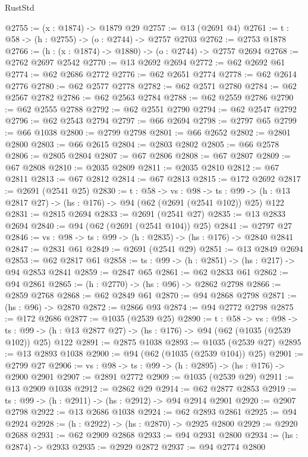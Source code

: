 \begin{lexlean}{RustStd}
\begin{coremodule}
@2755 := (x : @1874) -> @1879 @29
@2757 := @13 (@2691 @4)
@2761 := {t : @58} -> (h : @2755) -> (o : @2744) -> @2757 @2703
@2762 := @2753 @1878
@2766 := (h : (x : @1874) -> @1880) -> (o : @2744) -> @2757 @2694
@2768 := @2762 @2697 @2542
@2770 := @13 @2692 @2694
@2772 := @62 @2692 @61
@2774 := @62 @2686 @2772
@2776 := @62 @2651 @2774
@2778 := @62 @2614 @2776
@2780 := @62 @2577 @2778
@2782 := @62 @2571 @2780
@2784 := @62 @2567 @2782
@2786 := @62 @2563 @2784
@2788 := @62 @2559 @2786
@2790 := @62 @2555 @2788
@2792 := @62 @2551 @2790
@2794 := @62 @2547 @2792
@2796 := @62 @2543 @2794
@2797 := @66 @2694
@2798 := @2797 @65
@2799 := @66 @1038
@2800 := @2799 @2798
@2801 := @66 @2652
@2802 := @2801 @2800
@2803 := @66 @2615
@2804 := @2803 @2802
@2805 := @66 @2578
@2806 := @2805 @2804
@2807 := @67 @2806
@2808 := @67 @2807
@2809 := @67 @2808
@2810 := @2035 @2809
@2811 := @2035 @2810
@2812 := @67 @2811
@2813 := @67 @2812
@2814 := @67 @2813
@2815 := @172 @2692
@2817 := @2691 (@2541 @25)
@2830 := {t : @58} ->
  {vs : @98} ->
  {ts : @99} -> (h : @13 @2817 @27) -> (hs : @176) -> @94 (@62 (@2691 (@2541 @102)) @25) @122
@2831 := @2815 @2694
@2833 := @2691 (@2541 @27)
@2835 := @13 @2833 @2694
@2840 := @94 (@62 (@2691 (@2541 @104)) @25)
@2841 := @2797 @27
@2846 := {vs : @98} -> {ts : @99} -> (h : @2835) -> (hs : @176) -> @2840 @2841
@2847 := @2831 @61
@2849 := @2691 (@2541 @29)
@2851 := @13 @2849 @2694
@2853 := @62 @2817 @61
@2858 := {ts : @99} -> (h : @2851) -> (hs : @217) -> @94 @2853 @2841
@2859 := @2847 @65
@2861 := @62 @2833 @61
@2862 := @94 @2861
@2865 := (h : @2770) -> (hs : @96) -> @2862 @2798
@2866 := @2859 @2768
@2868 := @62 @2849 @61
@2870 := @94 @2868 @2798
@2871 := (hs : @96) -> @2870
@2872 := @2866 @93
@2874 := @94 @2772 @2798
@2875 := @172 @2686
@2877 := @1035 (@2539 @25)
@2890 := {t : @58} ->
  {vs : @98} ->
  {ts : @99} -> (h : @13 @2877 @27) -> (hs : @176) -> @94 (@62 (@1035 (@2539 @102)) @25) @122
@2891 := @2875 @1038
@2893 := @1035 (@2539 @27)
@2895 := @13 @2893 @1038
@2900 := @94 (@62 (@1035 (@2539 @104)) @25)
@2901 := @2799 @27
@2906 := {vs : @98} -> {ts : @99} -> (h : @2895) -> (hs : @176) -> @2900 @2901
@2907 := @2891 @2772
@2909 := @1035 (@2539 @29)
@2911 := @13 @2909 @1038
@2912 := @2862 @29
@2914 := @62 @2877 @2853
@2919 := {ts : @99} -> (h : @2911) -> (hs : @2912) -> @94 @2914 @2901
@2920 := @2907 @2798
@2922 := @13 @2686 @1038
@2924 := @62 @2893 @2861
@2925 := @94 @2924
@2928 := (h : @2922) -> (hs : @2870) -> @2925 @2800
@2929 := @2920 @2688
@2931 := @62 @2909 @2868
@2933 := @94 @2931 @2800
@2934 := (hs : @2874) -> @2933
@2935 := @2929 @2872
@2937 := @94 @2774 @2800

\end{coremodule}
\end{lexlean}
